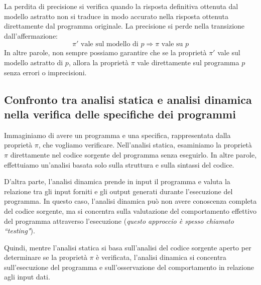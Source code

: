 La perdita di precisione si verifica quando la risposta definitiva ottenuta dal
modello astratto non si traduce in modo accurato nella risposta ottenuta
direttamente dal programma originale. La precisione si perde nella transizione dall'affermazione:
\[
  \pi' \text{ vale sul modello di } p \Longrightarrow \pi \text{ vale su } p
\]
In altre parole, non sempre possiamo garantire che se la proprietà $\pi'$ vale
sul modello astratto di $p$, allora la proprietà $\pi$ vale direttamente sul
programma $p$ senza errori o imprecisioni. 
\subsection{Confronto tra analisi statica e analisi dinamica nella verifica delle specifiche dei programmi}
Immaginiamo di avere un programma e una specifica, rappresentata dalla proprietà $\pi$, che vogliamo
verificare. Nell'analisi statica, esaminiamo la proprietà $\pi$ direttamente nel codice sorgente del
programma senza eseguirlo. In altre parole, effettuiamo un'analisi basata solo sulla struttura e sulla
sintassi del codice.

D'altra parte, l'analisi dinamica prende in input il programma e valuta la relazione tra gli input
forniti e gli output generati durante l'esecuzione del programma. In questo caso, l'analisi dinamica
può non avere conoscenza completa del codice sorgente, ma si concentra sulla valutazione del comportamento
effettivo del programma attraverso l'esecuzione (\textit{questo approccio è spesso chiamato ``testing"}).

Quindi, mentre l'analisi statica si basa sull'analisi del codice sorgente aperto per determinare se la
proprietà $\pi$ è verificata, l'analisi dinamica si concentra sull'esecuzione del
programma e sull'osservazione del comportamento in relazione agli input dati.
